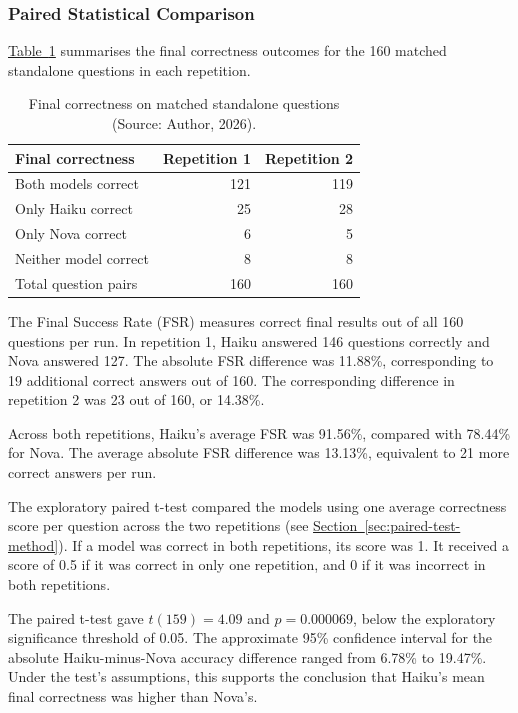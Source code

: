\subsubsection{Paired Statistical Comparison}
\label{sec:results-paired-test}

\hyperref[tab:results-paired-correctness]{Table~\ref*{tab:results-paired-correctness}}
summarises the final correctness outcomes for the 160 matched standalone
questions in each repetition.

\begin{table}[H]
\centering
{\small
\setlength{\tabcolsep}{6pt}
\begin{tabularx}{\textwidth}{@{}>{\raggedright\arraybackslash}Xrr@{}}
\toprule
\textbf{Final correctness} & \textbf{Repetition 1} & \textbf{Repetition 2} \\
\midrule
Both models correct & 121 & 119 \\
Only Haiku correct & 25 & 28 \\
Only Nova correct & 6 & 5 \\
Neither model correct & 8 & 8 \\
\midrule
Total question pairs & 160 & 160 \\
\bottomrule
\end{tabularx}
}
\caption{Final correctness on matched standalone questions (Source: Author, 2026).}
\label{tab:results-paired-correctness}
\end{table}

The Final Success Rate (FSR) measures correct final results out of all 160 questions per run.
In repetition 1, Haiku answered 146 questions correctly and Nova answered 127. 
The absolute FSR difference was 11.88\%, 
corresponding to 19 additional correct answers out of 160. 
The corresponding difference in repetition 2 was 23 out of 160, or 14.38\%.

Across both repetitions, Haiku's average FSR was 91.56\%,
compared with 78.44\% for Nova.
The average absolute FSR difference was 13.13\%,
equivalent to 21 more correct answers per run.

The exploratory paired t-test compared the models using one average correctness
score per question across the two repetitions
(see \hyperref[sec:paired-test-method]{Section~\ref*{sec:paired-test-method}}).
If a model was correct in both repetitions, its score was 1.
It received a score of 0.5 if it was correct in only one repetition, 
and 0 if it was incorrect in both repetitions.

The paired t-test gave $t(159)=4.09$ and
$p=0.000069$, below the exploratory significance threshold of 0.05.
The approximate 95\% confidence interval for the absolute Haiku-minus-Nova
accuracy difference ranged from 6.78\% to 19.47\%. 
Under the test's assumptions, this supports the conclusion that Haiku's mean final correctness was higher than Nova's.


